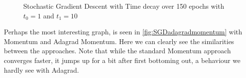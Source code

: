 \documentclass{article}
\theoremstyle{definition}
\begin{document}
\begin{figure}[H]%
    \centering
    \qquad
    \caption{Stochastic Gradient Descent with Time decay over 150 epochs with $t_0 = 1$ and $t_1 = 10$}%
    \label{fig:SGDtimedecay}%
\end{figure}

Perhaps the most interesting graph, is seen in \autoref{fig:SGDadagradmomentum} with Momentum and Adagrad Momentum. Here we can clearly see the similarities between the approaches. Note that while the standard Momentum approach converges faster, it jumps up for a bit after first bottoming out, a behaviour we hardly see with Adagrad.
\end{document}
